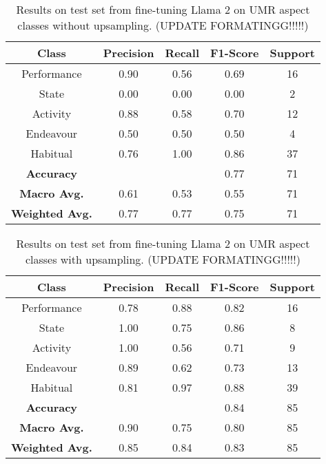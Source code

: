 \begin{table}
    \centering
    \begin{tabular}{|c|c|c|c|c|}\hline
        \textbf{Class} & \textbf{Precision} & \textbf{Recall} & \textbf{F1-Score} & \textbf{Support} \\ \hline
        Performance & 0.90 & 0.56 & 0.69 & 16\\ \hline
        State & 0.00 & 0.00 & 0.00 & 2\\\hline
        Activity & 0.88 & 0.58 & 0.70 & 12\\\hline
        Endeavour & 0.50 & 0.50 & 0.50 & 4\\\hline
        Habitual & 0.76 & 1.00 & 0.86 & 37\\ \hline \hline
        \textbf{Accuracy} &  &  & 0.77 & 71 \\ \hline
        \textbf{Macro Avg.} & 0.61  & 0.53 & 0.55 & 71 \\ \hline
        \textbf{Weighted Avg.} & 0.77  & 0.77 & 0.75 & 71 \\ \hline

    \end{tabular}
    \caption{Results on test set from fine-tuning Llama 2 on UMR aspect classes without upsampling. (UPDATE FORMATINGG!!!!!)}
\end{table}
\label{llama_results_no_upsampling}

\begin{table}
    \centering
    \begin{tabular}{|c|c|c|c|c|}\hline
        \textbf{Class} & \textbf{Precision} & \textbf{Recall} & \textbf{F1-Score} & \textbf{Support} \\ \hline
        Performance & 0.78 & 0.88 & 0.82 & 16\\ \hline
        State & 1.00 & 0.75 & 0.86 & 8\\\hline
        Activity & 1.00 & 0.56 & 0.71 & 9\\\hline
        Endeavour & 0.89 & 0.62 & 0.73 & 13\\\hline
        Habitual & 0.81 & 0.97 & 0.88 & 39\\ \hline \hline
        \textbf{Accuracy} &  &  & 0.84 & 85 \\ \hline
        \textbf{Macro Avg.} & 0.90  & 0.75 & 0.80 & 85 \\ \hline
        \textbf{Weighted Avg.} & 0.85  & 0.84 & 0.83 & 85 \\ \hline

    \end{tabular}
    \caption{Results on test set from fine-tuning Llama 2 on UMR aspect classes with upsampling. (UPDATE FORMATINGG!!!!!)}
\end{table}
\label{llama_results_upsampling}


